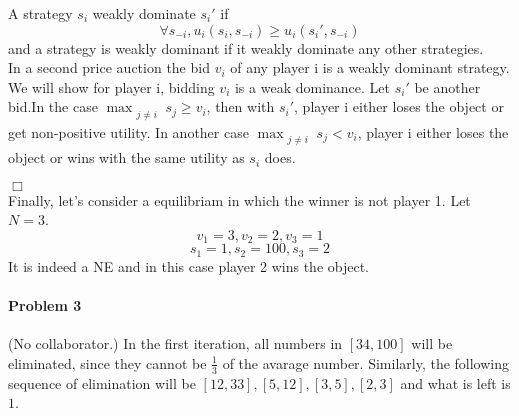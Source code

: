 \documentclass[12pt]{article}
\newenvironment{proof}{\noindent{\em Proof.} \hspace*{1mm}}{
\hspace*{\fill} $\Box$ }
\begin{document}
\begin{itemize}
A strategy $s_i$ weakly dominate $s_i'$ if $$\forall s_{-i}, u_i(s_i,
s_{-i}) \geq u_i(s_i', s_{-i})$$ and a strategy is weakly dominant if
it weakly dominate any other strategies.
\\
In a second price auction the bid $v_i$ of any player i is a weakly
dominant strategy.
\begin{proof}\\
We will show for player i, bidding $v_i$ is a weak dominance. Let
$s_i'$ be another bid.In the case $\displaystyle \max_{\substack{j\neq
    i}}s_j \geq v_i$, then with $s_i'$, player i either loses the
object or get non-positive utility. In another case $\displaystyle
\max_{\substack{j\neq i}}s_j<v_i$, player i either loses the object or
wins with the same utility as $s_i$ does.
\end{proof}\\
 Finally, let's consider a equilibriam in which the winner is not
 player 1. Let $N=3$.
$$v_1 = 3, v_2 = 2, v_3 = 1$$
$$s_1 = 1, s_2 = 100, s_3 = 2$$
It is indeed a NE and in this case player 2 wins the object.
\end{itemize}

\bigskip

\paragraph{Problem 3} (No collaborator.)
In the first iteration, all numbers in $[34,100]$ will be eliminated,
since they cannot be 
$\frac{1}{3}$ of the avarage number. Similarly, the following
sequence of elimination will
be $[12,33],[5,12],[3,5],[2,3]$ and what is
left is $1$.




\begin{thebibliography}{99}



\end{thebibliography}
\end{document}
